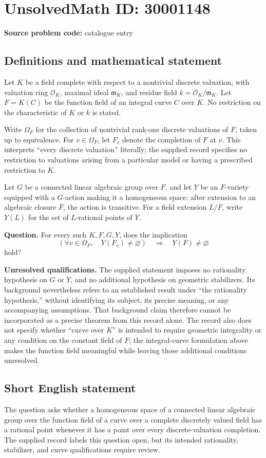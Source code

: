\documentclass[11pt]{article}
\begin{document}
\section*{UnsolvedMath ID: 30001148}
\textbf{Source problem code:} catalogue entry
\subsection{Definitions and mathematical statement}
Let \(K\) be a field complete with respect to a nontrivial discrete valuation, with valuation ring \(\mathcal O_K\), maximal ideal \(\mathfrak m_K\), and residue field \(k=\mathcal O_K/\mathfrak m_K\). Let \(F=K(C)\) be the function field of an integral curve \(C\) over \(K\). No restriction on the characteristic of \(K\) or \(k\) is stated.

Write \(\Omega_F\) for the collection of nontrivial rank-one discrete valuations of \(F\), taken up to equivalence. For \(v\in\Omega_F\), let \(F_v\) denote the completion of \(F\) at \(v\). This interprets ``every discrete valuation'' literally; the supplied record specifies no restriction to valuations arising from a particular model or having a prescribed restriction to \(K\).

Let \(G\) be a connected linear algebraic group over \(F\), and let \(Y\) be an \(F\)-variety equipped with a \(G\)-action making it a homogeneous space: after extension to an algebraic closure \(\overline F\), the action is transitive. For a field extension \(L/F\), write \(Y(L)\) for the set of \(L\)-rational points of \(Y\).

\textbf{Question.} For every such \(K,F,G,Y\), does the implication
\[
\left(\forall v\in\Omega_F,\quad Y(F_v)\ne\varnothing\right)
\quad\Longrightarrow\quad
Y(F)\ne\varnothing
\]
hold?

\textbf{Unresolved qualifications.} The supplied statement imposes no rationality hypothesis on \(G\) or \(Y\), and no additional hypothesis on geometric stabilizers. Its background nevertheless refers to an established result under ``the rationality hypothesis,'' without identifying its subject, its precise meaning, or any accompanying assumptions. That background claim therefore cannot be incorporated as a precise theorem from this record alone. The record also does not specify whether ``curve over \(K\)'' is intended to require geometric integrality or any condition on the constant field of \(F\); the integral-curve formulation above makes the function field meaningful while leaving those additional conditions unresolved.
\subsection{Short English statement}
The question asks whether a homogeneous space of a connected linear algebraic group over the function field of a curve over a complete discretely valued field has a rational point whenever it has a point over every discrete-valuation completion. The supplied record labels this question open, but its intended rationality, stabilizer, and curve qualifications require review.
\end{document}
